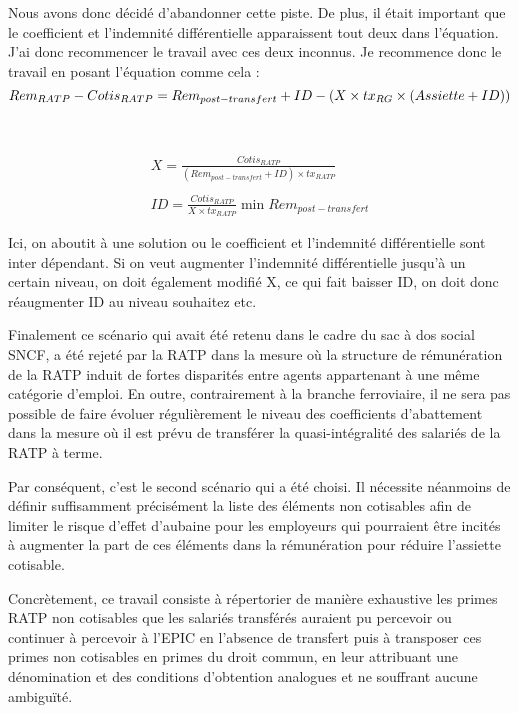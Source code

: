 Nous avons donc décidé d'abandonner cette piste. De plus, il était important que le coefficient et l'indemnité différentielle apparaissent tout deux dans l'équation. J'ai donc recommencer le travail avec ces deux inconnus. Je recommence donc le travail en posant l'équation comme cela :
\begin{equation*}
Rem_{RATP} - Cotis_{RATP} = Rem_{post-transfert} + ID - (X \times tx_{RG} \times (Assiette + ID))\\
\end{equation*}
\\
 \\
\begin{multline*}
X = \frac{Cotis_{RATP}}{(Rem_{post-transfert} + ID) \times tx_{RATP}}\\
\\
ID = \frac{Cotis_{RATP}}{X \times tx_{RATP}} \min Rem_{post-transfert}
\end{multline*}


Ici, on aboutit à une solution ou le coefficient et l'indemnité différentielle sont inter dépendant. Si on veut augmenter l'indemnité différentielle jusqu'à un certain niveau, on doit également modifié X, ce qui fait baisser ID, on doit donc réaugmenter ID au niveau souhaitez etc.

Finalement ce scénario qui avait été retenu dans le cadre du sac à dos social SNCF, a été rejeté par la RATP dans la mesure  où la structure de rémunération de la RATP induit de fortes disparités entre agents appartenant à une même  catégorie d’emploi. En outre, contrairement à la branche ferroviaire, il ne sera pas possible de faire évoluer régulièrement le niveau des coefficients d’abattement dans la mesure où il  est prévu de transférer la quasi-intégralité des salariés de la RATP à terme.

Par conséquent, c'est le second scénario qui a été choisi. Il nécessite néanmoins de définir suffisamment précisément la  liste des éléments non cotisables afin de limiter le risque d’effet d’aubaine pour les employeurs qui pourraient être  incités à augmenter la part de ces éléments dans la rémunération pour réduire l’assiette cotisable. 

Concrètement, ce travail consiste à répertorier de manière exhaustive les primes RATP non cotisables que les salariés transférés auraient pu percevoir ou continuer à percevoir à l’EPIC en l’absence de transfert puis à transposer ces primes non cotisables en primes du droit commun, en leur attribuant une dénomination et des conditions d’obtention analogues et ne souffrant aucune ambiguïté.


